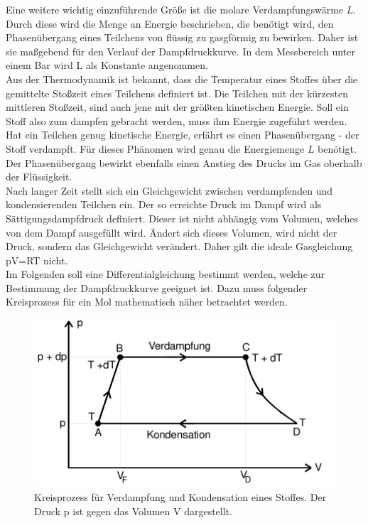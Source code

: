 \noindent
Eine weitere wichtig einzuführende Größe ist die molare Verdampfungswärme $L$. Durch diese wird die Menge an Energie beschrieben, die benötigt wird, den Phasenübergang
eines Teilchens von flüssig zu gasgförmig zu bewirken.
Daher ist sie maßgebend für den Verlauf der Dampfdruckkurve. In dem Messbereich
unter einem Bar wird L als Konstante angenommen.\\
Aus der Thermodynamik ist bekannt, dass die Temperatur eines Stoffes über die gemittelte Stoßzeit eines Teilchens definiert ist. Die Teilchen
mit der kürzesten mittleren Stoßzeit, sind auch jene mit der größten kinetischen Energie. Soll ein Stoff also zum dampfen gebracht werden, muss ihm Energie zugeführt werden.
Hat ein Teilchen genug kinetische Energie, erfährt es einen Phasenübergang - der Stoff verdampft. Für dieses Phänomen
wird genau die Energiemenge $L$ benötigt. Der Phasenübergang bewirkt ebenfalls einen Anstieg des Drucks im Gas oberhalb der Flüssigkeit.\\
Nach langer Zeit stellt sich ein Gleichgewicht zwischen verdampfenden und kondensierenden Teilchen ein. Der so erreichte Druck im Dampf
wird als Sättigungsdampfdruck definiert. Dieser ist nicht abhängig vom Volumen, welches von dem Dampf ausgefüllt wird. Ändert sich dieses Volumen, wird nicht der Druck, sondern das Gleichgewicht verändert. 
Daher gilt die ideale Gasgleichung
pV=RT nicht.\\
Im Folgenden soll eine Differentialgleichung bestimmt werden, welche zur Bestimmung der Dampfdruckkurve geeignet ist.
Dazu muss folgender Kreisprozess für ein Mol mathematisch näher betrachtet werden.
\begin{figure}[h!]
    \centering
    \includegraphics[scale=0.8]{sreen2.jpg}
    \caption{Kreisprozess für Verdampfung und Kondensation eines Stoffes. Der Druck p ist
    gegen das Volumen V dargestellt.}
    \label{Abb2:Kreisprozess}
\end{figure}
